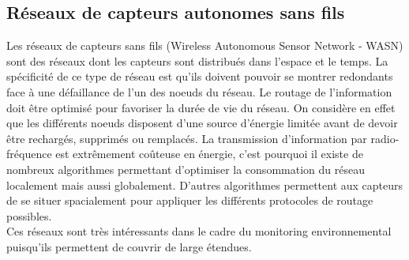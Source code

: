\documentclass[10pt, article]{llncs}
\begin{document}
		\subsection{Réseaux de capteurs autonomes sans fils}
			Les réseaux de capteurs sans fils (Wireless Autonomous Sensor Network - WASN) sont des réseaux dont les capteurs sont distribués dans l'espace et le temps. La spécificité de ce type de réseau est qu'ils doivent pouvoir se montrer redondants face à une défaillance de l'un des noeuds du réseau. Le routage de l'information doit être optimisé pour favoriser la durée de vie du réseau. On considère en effet que les différents noeuds disposent d'une source d'énergie limitée avant de devoir être rechargés, supprimés ou remplacés. La transmission d'information par radio-fréquence est extrêmement coûteuse en énergie, c'est pourquoi il existe de nombreux algorithmes permettant d'optimiser la consommation du réseau localement mais aussi globalement. D'autres algorithmes permettent aux capteurs de se situer spacialement pour appliquer les différents protocoles de routage possibles.\\
			Ces réseaux sont très intéressants dans le cadre du monitoring environnemental puisqu'ils permettent de couvrir de large étendues. \cite{professor_course_nodate}
		
\end{document}

